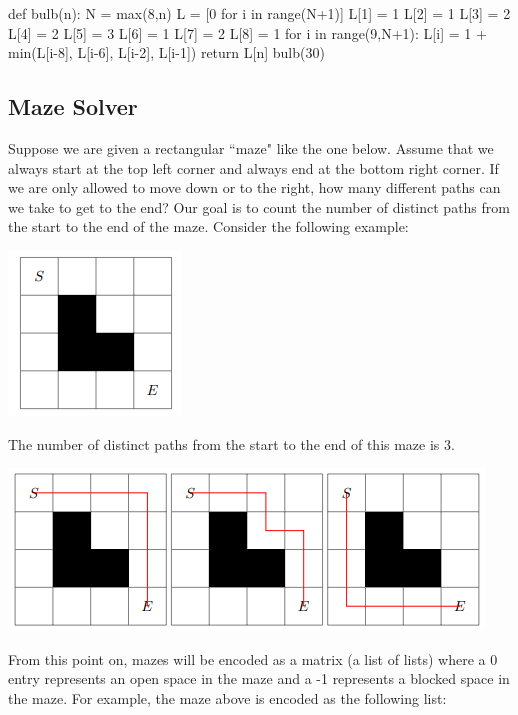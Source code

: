 \documentclass{ximera}
\begin{document}
\begin{sageCell}
def bulb(n):
        N = max(8,n)
        L = [0 for i in range(N+1)]
        L[1] = 1
        L[2] = 1
        L[3] = 2
        L[4] = 2
        L[5] = 3
        L[6] = 1
        L[7] = 2
        L[8] = 1
        for i in range(9,N+1):
                L[i] = 1 + min(L[i-8], L[i-6], L[i-2], L[i-1])
        return L[n]
bulb(30)
\end{sageCell}

\subsection{Maze Solver}

Suppose we are given a rectangular ``maze" like the one below. Assume that we always start at the top left corner and always end at the bottom right corner. If we are only allowed to move down or to the right, how many different paths can we take to get to the end? Our goal is to count the number of distinct paths from the start to the end of the maze. Consider the following example:

\begin{center}
\includegraphics{maze_example.png} 
\end{center}

The number of distinct paths from the start to the end of this maze is 3.

\begin{center}
\includegraphics{maze_example_solutions.png}
\end{center}

From this point on, mazes will be encoded as a matrix (a list of lists) where a 0 entry represents an open space in the maze and a -1 represents a blocked space in the maze. For example, the maze above is encoded as the following list:
\end{document}
